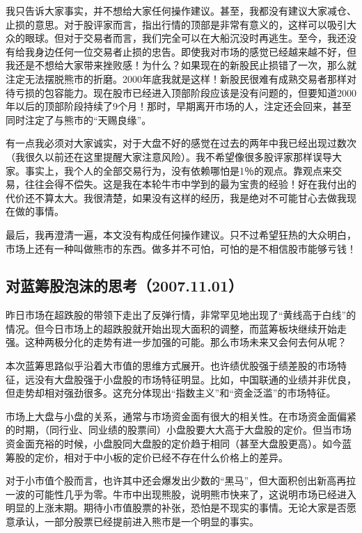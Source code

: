 我只告诉大家事实，并不想给大家任何操作建议。甚至，我都没有建议大家减仓、止损的意思。对于股评家而言，指出行情的顶部是非常有意义的，这样可以吸引大众的眼球。但对于交易者而言，我们完全可以在大船沉没时再逃生。至今，我还没有给我身边任何一位交易者止损的忠告。即使我对市场的感觉已经越来越不好，但我还是不想给大家带来挫败感！为什么？如果现在的新股民止损错了一次，那么就注定无法摆脱熊市的折磨。2000年底我就是这样！新股民很难有成熟交易者那样对待亏损的包容能力。现在股市已经进入顶部阶段应该是没有问题的，但要知道2000年以后的顶部阶段持续了9个月！那时，早期离开市场的人，注定还会回来，甚至同时注定了与熊市的“天赐良缘”。

有一点我必须对大家诚实，对于大盘不好的感觉在过去的两年中我已经出现过数次（我很久以前还在这里提醒大家注意风险）。我不希望像很多股评家那样误导大家。事实上，我个人的全部交易行为，没有依赖哪怕是1％的观点。靠观点来交易，往往会得不偿失。这是我在本轮牛市中学到的最为宝贵的经验！好在我付出的代价还不算太大。我很清楚，如果没有这样的经历，我是绝对不可能甘心去做我现在做的事情。

最后，我再澄清一遍，本文没有构成任何操作建议。只不过希望狂热的大众明白，市场上还有一种叫做熊市的东西。做多并不可怕，可怕的是不相信股市能够亏钱！

\subsection{对蓝筹股泡沫的思考（2007.11.01）}

昨日市场在超跌股的带领下走出了反弹行情，非常罕见地出现了“黄线高于白线”的情况。但今日市场上的超跌股就开始出现大面积的调整，而蓝筹板块继续开始走强。这种两极分化的走势有进一步加强的可能。那么市场未来又会何去何从呢？

本次蓝筹思路似乎沿着大市值的思维方式展开。也许绩优股强于绩差股的市场特征，远没有大盘股强于小盘股的市场特征明显。比如，中国联通的业绩并非优良，但走势却相对强劲很多。这充分体现出“指数主义”和“资金泛滥”的市场特征。

市场上大盘与小盘的关系，通常与市场资金面有很大的相关性。在市场资金面偏紧的时期，（同行业、同业绩的股票间）小盘股要大大高于大盘股的定价。但当市场资金面充裕的时候，小盘股同大盘股的定价趋于相同（甚至大盘股更高）。如今蓝筹股的定价，相对于中小板的定价已经不存在什么价格上的差异。

对于小市值个股而言，也许其中还会爆发出少数的“黑马”，但大面积创出新高再拉一波的可能性几乎为零。牛市中出现熊股，说明熊市快来了，这说明市场已经进入明显的上涨末期。期待小市值股票的补张，恐怕是不现实的事情。无论大家是否愿意承认，一部分股票已经提前进入熊市是一个明显的事实。

